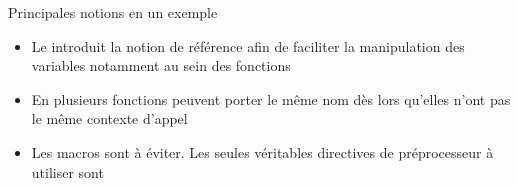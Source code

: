 \documentclass[c]{beamer}
\begin{document}
\begin{frame}[fragile]{Principales notions en un exemple}
 \begin{itemize}
\item Le \Cpp introduit la notion de référence afin de faciliter la manipulation des
variables notamment au sein des fonctions

\begin{center}
\end{center}
\end{itemize}

\pause

\begin{itemize}
\item En \Cpp plusieurs fonctions peuvent porter le même nom dès lors qu'elles n'ont
pas le même contexte d'appel

\begin{center}
\end{center}
\end{itemize}

\pause

\begin{itemize}
\item Les macros sont à éviter. Les seules véritables directives de préprocesseur à
utiliser sont 

\begin{center}
\end{center}
\end{itemize}
\end{frame}


\end{document}
